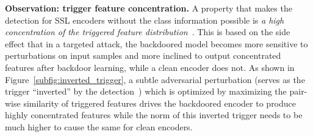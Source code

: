 \textbf{Observation: trigger feature concentration.} A property that makes the detection for SSL encoders without the class information possible is \emph{a high concentration of the triggered feature distribution}~\cite{feng2023detecting}. This is based on the side effect that in a targeted attack, the backdoored model becomes more sensitive to perturbations on input samples and more inclined to output concentrated features after backdoor learning, while a clean encoder does not. As shown in Figure~\ref{subfig:inverted_trigger}, a subtle adversarial perturbation (serves as the trigger ``inverted'' by the detection~\citep{feng2023detecting}) which is optimized by maximizing the pair-wise similarity of triggered features drives the backdoored encoder to produce highly concentrated features while the norm of this inverted trigger needs to be much higher to cause the same for clean encoders. 

